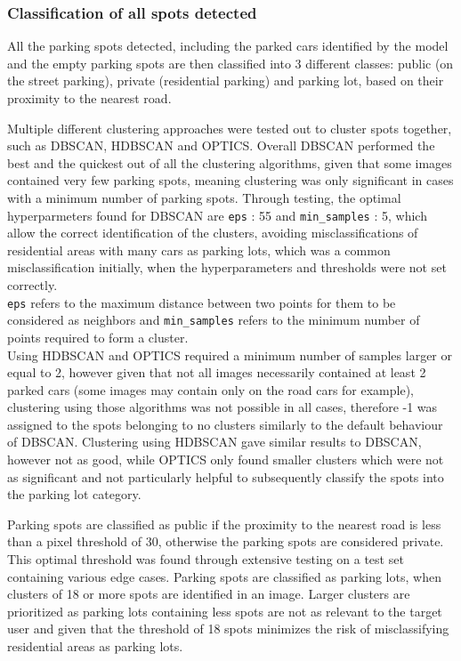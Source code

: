 \newpage

\subsubsection{Classification of all spots detected}
All the parking spots detected, including the parked cars identified by the
model and the empty parking spots are then classified into 3 different classes:
public (on the street parking), private (residential parking) and parking lot,
based on their proximity to the nearest road.

Multiple different clustering approaches were tested out to cluster spots
together, such as DBSCAN, HDBSCAN and OPTICS. Overall DBSCAN performed the best
and the quickest out of all the clustering algorithms, given that some images
contained very few parking spots, meaning clustering was only significant in
cases with a minimum number of parking spots. Through testing, the optimal
hyperparmeters found for DBSCAN are \texttt{eps} : 55 and \texttt{min\_samples}
: 5, which allow the correct identification of the clusters, avoiding
misclassifications of residential areas with many cars as parking lots, which
was a common misclassification initially, when the hyperparameters and
thresholds were not set correctly.\\
\texttt{eps} refers to the maximum distance between two points for them to be
considered as neighbors and \texttt{min\_samples} refers to the minimum number
of points required to form a cluster.\\
Using HDBSCAN and OPTICS required a minimum number of samples larger or equal to
2, however given that not all images necessarily contained at least 2 parked
cars (some images may contain only on the road cars for example), clustering
using those algorithms was not possible in all cases, therefore -1 was assigned
to the spots belonging to no clusters similarly to the default behaviour of
DBSCAN. Clustering using HDBSCAN gave similar results to DBSCAN, however not as
good, while OPTICS only found smaller clusters which were not as significant and
not particularly helpful to subsequently classify the spots into the parking lot
category.

Parking spots are classified as public if the proximity to the nearest road is
less than a pixel threshold of 30, otherwise the parking spots are considered
private. This optimal threshold was found through extensive testing on a test
set containing various edge cases. Parking spots are classified as parking lots,
when clusters of 18 or more spots are identified in an image. Larger clusters
are prioritized as parking lots containing less spots are not as relevant to the
target user and given that the threshold of 18 spots minimizes the risk of
misclassifying residential areas as parking lots.

